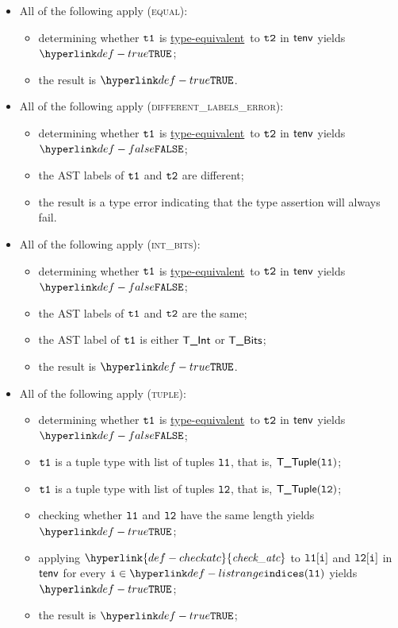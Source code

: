 \documentclass{book}
\newcommand\ProseOrTypeError[0]{\ProseTerminateAs{\TypeErrorConfig}}
\newcommand\checkatc[0]{\hyperlink{def-checkatc}{\textfunc{check\_atc}}}
\newcommand\typeequivalent[0]{\hyperlink{def-typeequal}{type-equivalent}}
\newcommand\TypeErrorCode[1]{\texttt{TE\_#1}}
\newcommand\TypeAsssertionFails[0]{\hyperlink{def-taf}{\TypeErrorCode{TAF}}}
\begin{document}
\begin{itemize}
  \item All of the following apply (\textsc{equal}):
  \begin{itemize}
    \item determining whether $\texttt{t1}$ is \typeequivalent\ to $\texttt{t2}$ in $\textsf{tenv}$ yields $\True$\ProseOrTypeError;
    \item the result is $\True$.
  \end{itemize}

  \item All of the following apply (\textsc{different\_labels\_error}):
  \begin{itemize}
    \item determining whether $\texttt{t1}$ is \typeequivalent\ to $\texttt{t2}$ in $\textsf{tenv}$ yields $\False$;
    \item the AST labels of $\texttt{t1}$ and $\texttt{t2}$ are different;
    \item the result is a type error indicating that the type assertion will always fail.
  \end{itemize}

  \item All of the following apply (\textsc{int\_bits}):
  \begin{itemize}
    \item determining whether $\texttt{t1}$ is \typeequivalent\ to $\texttt{t2}$ in $\textsf{tenv}$ yields $\False$;
    \item the AST labels of $\texttt{t1}$ and $\texttt{t2}$ are the same;
    \item the AST label of $\texttt{t1}$ is either $\textsf{T\_Int}$ or $\textsf{T\_Bits}$;
    \item the result is $\True$.
  \end{itemize}

  \item All of the following apply (\textsc{tuple}):
  \begin{itemize}
    \item determining whether $\texttt{t1}$ is \typeequivalent\ to $\texttt{t2}$ in $\textsf{tenv}$ yields $\False$;
    \item $\texttt{t1}$ is a tuple type with list of tuples $\texttt{l1}$, that is, $\textsf{T\_Tuple}(\texttt{l1})$;
    \item $\texttt{t1}$ is a tuple type with list of tuples $\texttt{l2}$, that is, $\textsf{T\_Tuple}(\texttt{l2})$;
    \item checking whether $\texttt{l1}$ and $\texttt{l2}$ have the same length yields $\True$\ProseTerminateAs{\TypeErrorVal{\TypeAsssertionFails}};
    \item applying $\checkatc$ to $\texttt{l1}[\texttt{i}]$ and $\texttt{l2}[\texttt{i}]$ in $\textsf{tenv}$ for every $\vi\in\listrange(\vlone)$ yields $\True$\ProseOrTypeError;
    \item the result is $\True$;
  \end{itemize}


\end{itemize}
\end{document}
